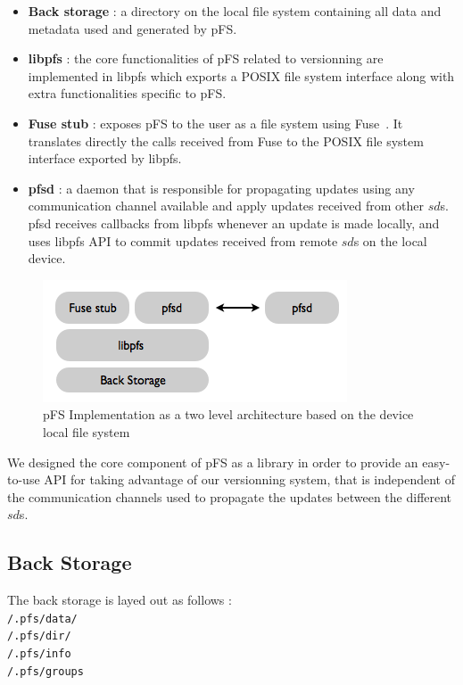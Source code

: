 \begin {itemize}
\item \textbf{Back storage} : a directory on the local file system
  containing all data and metadata used and generated by pFS.
\item \textbf{libpfs} : the core functionalities of pFS related to
  versionning are implemented in libpfs which exports a POSIX file
  system interface along with extra functionalities specific to
  pFS.
\item \textbf{Fuse stub} : exposes pFS to the user as a file system
  using Fuse~\cite{henk:fuse}. It translates directly the calls
  received from Fuse to the POSIX file system interface exported by
  libpfs.
\item \textbf{pfsd} : a daemon that is responsible for propagating
  updates using any communication channel available and apply updates
  received from other $sd$s. pfsd receives callbacks from libpfs
  whenever an update is made locally, and uses libpfs API to commit
  updates received from remote $sd$s on the local device.
\end {itemize}

\begin{figure}[ht]
\begin{center}
  \includegraphics [scale=0.6] {img/impl}
  \caption{\label{PfsImpl} {\small pFS Implementation as a two level
      architecture based on the device local file system}}
\end{center}
\end{figure}

We designed the core component of pFS as a library in order to provide
an easy-to-use API for taking advantage of our versionning system, that
is independent of the communication channels used to propagate the
updates between the different $sd$s.

\subsection {Back Storage}

The back storage is layed out as follows : \\ 
{\tt /.pfs/data/} \\ 
{\tt /.pfs/dir/} \\ 
{\tt /.pfs/info} \\ 
{\tt /.pfs/groups} \\

